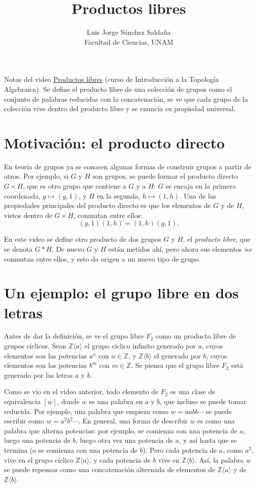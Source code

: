 \documentclass[11pt]{article}
\title{Productos libres}
\author{Luis Jorge Sánchez Saldaña\\[2pt]\small Facultad de Ciencias, UNAM}
\date{}
\begin{document}
\maketitle

\noindent\small Notas del video
\href{https://www.youtube.com/watch?v=bZZU7kzLI1s}{\guillemotleft{}Productos libres\guillemotright{}}
(curso de Introducción a la Topología Algebraica). Se define el producto libre de una colección de grupos como el conjunto de palabras reducidas con la concatenación, se ve que cada grupo de la colección vive dentro del producto libre y se enuncia su propiedad universal.
\normalsize

\section*{Motivación: el producto directo}

En teoría de grupos ya se conocen algunas formas de construir grupos a partir de otros. Por ejemplo, si $G$ y $H$ son grupos, se puede formar el producto directo $G\times H$, que es otro grupo que contiene a $G$ y a $H$: $G$ se encaja en la primera coordenada, $g\mapsto(g,1)$, y $H$ en la segunda, $h\mapsto(1,h)$. Una de las propiedades principales del producto directo es que los elementos de $G$ y de $H$, vistos dentro de $G\times H$, conmutan entre ellos:
\[
  (g,1)(1,h)=(1,h)(g,1).
\]

En este video se define otro producto de dos grupos $G$ y $H$, el \emph{producto libre}, que se denota $G*H$. De nuevo $G$ y $H$ están metidos ahí, pero ahora sus elementos \emph{no} conmutan entre ellos, y esto da origen a un nuevo tipo de grupo.

\section*{Un ejemplo: el grupo libre en dos letras}

Antes de dar la definición, se ve el grupo libre $F_2$ como un producto libre de grupos cíclicos. Sean $\mathbb{Z}\langle a\rangle$ el grupo cíclico infinito generado por $a$, cuyos elementos son las potencias $a^n$ con $n\in\mathbb{Z}$, y $\mathbb{Z}\langle b\rangle$ el generado por $b$, cuyos elementos son las potencias $b^m$ con $m\in\mathbb{Z}$. Se piensa que el grupo libre $F_2$ está generado por las letras $a$ y $b$.

Como se vio en el video anterior, todo elemento de $F_2$ es una clase de equivalencia $[w]$, donde $w$ es una palabra en $a$ y $b$, que incluso se puede tomar reducida. Por ejemplo, una palabra que empieza como $w=aabb\cdots$ se puede escribir como $w=a^2b^2\cdots$. En general, una forma de describir $w$ es como una palabra que alterna potencias: por ejemplo, se comienza con una potencia de $a$, luego una potencia de $b$, luego otra vez una potencia de $a$, y así hasta que se termina (o se comienza con una potencia de $b$). Pero cada potencia de $a$, como $a^2$, vive en el grupo cíclico $\mathbb{Z}\langle a\rangle$, y cada potencia de $b$ vive en $\mathbb{Z}\langle b\rangle$. Así, la palabra $w$ se puede repensar como una concatenación alternada de elementos de $\mathbb{Z}\langle a\rangle$ y de $\mathbb{Z}\langle b\rangle$.
\end{document}
